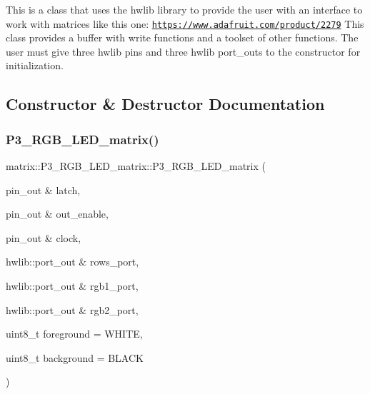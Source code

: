 This is a class that uses the hwlib library to provide the user with an interface to work with matrices like this one\+: \href{https://www.adafruit.com/product/2279}{\tt https\+://www.\+adafruit.\+com/product/2279} This class provides a buffer with write functions and a toolset of other functions. The user must give three hwlib pins and three hwlib port\+\_\+outs to the constructor for initialization. 

\subsection{Constructor \& Destructor Documentation}
\mbox{\label{classmatrix_1_1P3__RGB__LED__matrix_aadf4b19a9e7a0abc01387b87e92f6c7d}} 
\subsubsection{\texorpdfstring{P3\+\_\+\+R\+G\+B\+\_\+\+L\+E\+D\+\_\+matrix()}{P3\_RGB\_LED\_matrix()}}
{\footnotesize\ttfamily matrix\+::\+P3\+\_\+\+R\+G\+B\+\_\+\+L\+E\+D\+\_\+matrix\+::\+P3\+\_\+\+R\+G\+B\+\_\+\+L\+E\+D\+\_\+matrix (\begin{DoxyParamCaption}\item[{pin\+\_\+out \&}]{latch,  }\item[{pin\+\_\+out \&}]{out\+\_\+enable,  }\item[{pin\+\_\+out \&}]{clock,  }\item[{hwlib\+::port\+\_\+out \&}]{rows\+\_\+port,  }\item[{hwlib\+::port\+\_\+out \&}]{rgb1\+\_\+port,  }\item[{hwlib\+::port\+\_\+out \&}]{rgb2\+\_\+port,  }\item[{uint8\+\_\+t}]{foreground = {\ttfamily WHITE},  }\item[{uint8\+\_\+t}]{background = {\ttfamily BLACK} }\end{DoxyParamCaption})\hspace{0.3cm}{\ttfamily [inline]}}



